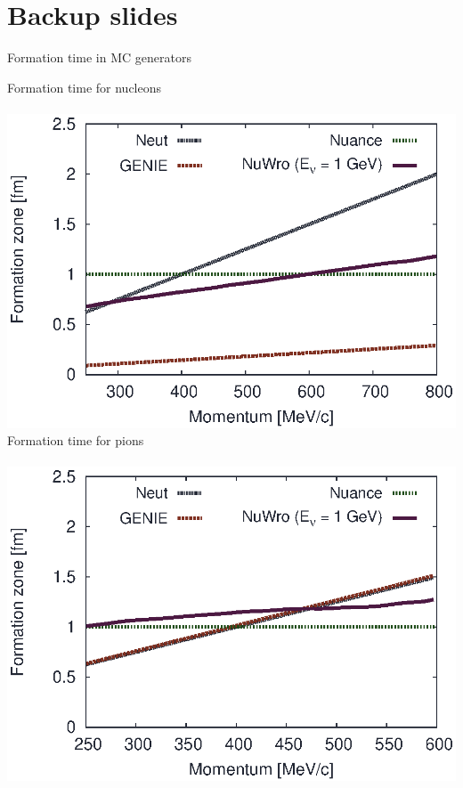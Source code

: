 \section{Backup slides}

\begin{slide}[toc=FT in MC generators]{Formation time in MC generators}
 
 \twocolumn
 {
 {\centering Formation time for nucleons\\}\mbox{}\\
 \includegraphics[width = \columnwidth]{img/fzn.eps}
 }
 {
 {\centering Formation time for pions\\}\mbox{}\\
 \includegraphics[width = \columnwidth]{img/fzp.eps} 
 }
 
 \begin{itemize}
 

\end{itemize}
\end{slide}

